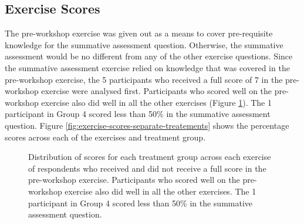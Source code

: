 \documentclass[acmsmall]{acmart}
\begin{document}
\subsection{Exercise Scores}

The pre-workshop exercise was given out as a means to cover pre-requisite knowledge for the
summative assessment question.
Otherwise, the summative assessment would be no different from any of the other exercise
questions.
Since the summative assessment exercise relied on knowledge that was covered in the
pre-workshop exercise,
the 5 participants who received a full score of 7 in the pre-workshop exercise were analysed first.
Participants who scored well on the pre-workshop exercise also did well in all the other exercises
(Figure \ref{fig:exercise-scores-pre100}).
The 1 participant in Group 4 scored less than 50\% in the summative assessment question.
Figure \ref{fig:exercise-scores-separate-treatements} shows the percentage scores across each
of the exercises and treatment group.

\begin{figure}[!hbtp]
	\centering
	\caption[Exercise scores of full scores and non full scores in pre-workshop exercise by treatment]
	{Distribution of scores for each treatment group across each exercise of
		respondents who received and did not receive a full score in the pre-workshop exercise.
		Participants who scored well on the pre-workshop exercise also did well in all the other exercises.
		The 1 participant in Group 4 scored less than 50\% in the summative assessment question.
	}
	\label{fig:exercise-scores-pre100}
\end{figure}
\end{document}
